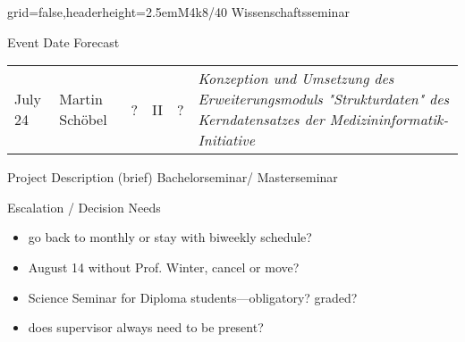 \documentclass[english]{kiesgrube}
\begin{document}
\begin{poster}{grid=false,headerheight=2.5em}{}{M4k8/40 Wissenschaftsseminar}{}{}
\begin{posterbox}[name=event,below=progress,span=2]{Event Date Forecast}
\begin{tabulary}{\textwidth}{lllllL}
July 24 &Martin Schöbel			&?		&II		&?	&\emph{Konzeption und Umsetzung des Erweiterungsmoduls "Strukturdaten" des Kerndatensatzes der Medizininformatik-Initiative}\\
\end{tabulary}
\end{posterbox}
\begin{posterbox}[name=description,column=1,row=0]{Project Description (brief)}
Bachelorseminar/ Masterseminar
\end{posterbox}
\begin{posterbox}[name=escalation,column=1,below=description]{Escalation / Decision Needs}
\begin{itemize}
\item go back to monthly or stay with biweekly schedule?
\item August 14 without Prof. Winter, cancel or move?
\item Science Seminar for Diploma students---obligatory? graded?
\item does supervisor always need to be present?
\end{itemize}
\end{posterbox}
\footer{}
\end{poster}
\end{document}
